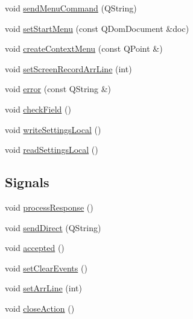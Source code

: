 \begin{DoxyCompactItemize}
void \hyperlink{classFglForm_a5e7fe57471d1f3ad4d6dbf7ac1c8b843}{sendMenuCommand} (QString)
\item 
void \hyperlink{classFglForm_af3d272e5dc101746b728bdd457d42a6f}{setStartMenu} (const QDomDocument \&doc)
\item 
void \hyperlink{classFglForm_af07f7257121ab71b9a53ccb2fd1a9fe3}{createContextMenu} (const QPoint \&)
\item 
void \hyperlink{classFglForm_afce8d989187c85d7bde751824a9b6c6a}{setScreenRecordArrLine} (int)
\item 
void \hyperlink{classFglForm_a3d2c6f2a3a0e1828ff1f43d4d93fa775}{error} (const QString \&)
\item 
void \hyperlink{classFglForm_a95fd29ee66dc40bb56d6bb94593feddd}{checkField} ()
\item 
void \hyperlink{classFglForm_a4fdd15cf1295a7d04b378e5c4cb2d877}{writeSettingsLocal} ()
\item 
void \hyperlink{classFglForm_ae9f393760ac910dd86de0919be07f41c}{readSettingsLocal} ()
\end{DoxyCompactItemize}
\subsection*{Signals}
\begin{DoxyCompactItemize}
\item 
void \hyperlink{classFglForm_a797f5a3e960a73a6fff9a1bb74059956}{processResponse} ()
\item 
void \hyperlink{classFglForm_ab8e58a4d027770ba170972d247b617dd}{sendDirect} (QString)
\item 
void \hyperlink{classFglForm_a1e972cdb1514dcb3c6613d123beb8f6a}{accepted} ()
\item 
void \hyperlink{classFglForm_a9c7de4f0bd6f44e3103df2e81a504974}{setClearEvents} ()
\item 
void \hyperlink{classFglForm_a7bef8f5a9e151e3b09d9de652b78ec92}{setArrLine} (int)
\item 
void \hyperlink{classFglForm_a6084470ee7bb46645d64a82503c60fba}{closeAction} ()
\end{DoxyCompactItemize}
